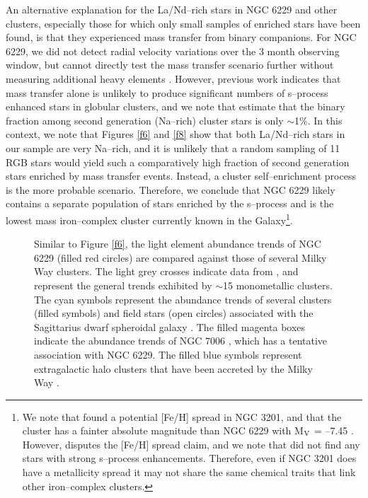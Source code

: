 \documentclass[12pt,preprint]{emulateapj}
\begin{document}
An alternative explanation for the La/Nd--rich stars in NGC 6229 and other 
clusters, especially those for which only small samples of enriched stars have
been found, is that they experienced mass transfer from binary companions.
For NGC 6229, we did not detect radial velocity variations over the 3 month
observing window, but cannot directly test the mass transfer scenario further
without measuring additional heavy elements \citep[e.g., see][]{Roederer16}.
However, previous work indicates that mass transfer alone is unlikely to 
produce significant numbers of s--process enhanced stars in globular clusters, 
and we note that \citet{D'Orazi10} estimate that the binary fraction among
second generation (Na--rich) cluster stars is only $\sim$1$\%$.  In this 
context, we note that Figures \ref{f6} and \ref{f8} show that both La/Nd--rich 
stars in our sample are very Na--rich, and it is unlikely that a random 
sampling of 11 RGB stars would yield such a comparatively high fraction 
of second generation stars enriched by mass transfer events.  Instead, a 
cluster self--enrichment process is the more probable scenario.  Therefore, we 
conclude that NGC 6229 likely contains a separate population of stars enriched 
by the s--process and is the lowest mass iron--complex cluster currently known 
in the Galaxy\footnote{We note that \citet{Simmerer13} found a potential [Fe/H]
spread in NGC 3201, and that the cluster has a fainter absolute magnitude than 
NGC 6229 with M$_{\rm V}$ = --7.45 \citep{Harris96}.  However, 
\citet{Mucciarelli15} disputes the [Fe/H] spread claim, and we note that 
\citet{Munoz13} did not find any stars with strong s--process enhancements.  
Therefore, even if NGC 3201 does have a metallicity spread it may not share 
the same chemical traits that link other iron--complex clusters.}.

\begin{figure*}
\caption{Similar to Figure \ref{f6}, the light element abundance trends of
NGC 6229 (filled red circles) are compared against those of several Milky Way
clusters.  The light grey crosses indicate data from \citet{Carretta09b,
Carretta09c}, and represent the general trends exhibited by $\sim$15
monometallic clusters.  The cyan symbols represent the abundance trends of
several clusters (filled symbols) and field stars (open circles) associated
with the Sagittarius dwarf spheroidal galaxy \citep{Bonifacio00,Cohen04,
Sbordone07,Carretta10a,McWilliam13,Carretta14b,Carretta17}.  The filled magenta
boxes indicate the abundance trends of NGC 7006 \citep{Kraft98}, which has a
tentative association with NGC 6229.  The filled blue symbols represent
extragalactic halo clusters that have been accreted by the Milky Way
\citep{Caliskan12,Mucciarelli13,Villanova13}.}
\label{f9}
\end{figure*}
\end{document}
